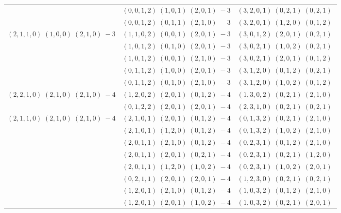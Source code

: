 \documentclass[11pt]{article}
\begin{document}
\begin{longtable}[l]{|c|c|c|}
 \cline{2-3} 
 & $(0 ,0 ,1 ,2) \;(1 ,0 ,1) \;(2 ,0 ,1) \;-3$ & $(3 ,2 ,0 ,1) \;(0 ,2 ,1) \;(0 ,2 ,1) \;$\\ 
 \cline{2-3} 
 & $(0 ,0 ,1 ,2) \;(0 ,1 ,1) \;(2 ,1 ,0) \;-3$ & $(3 ,2 ,0 ,1) \;(1 ,2 ,0) \;(0 ,1 ,2) \;$\\ \hline\multirow[t]{5}{*}{ $(2 ,1 ,1 ,0) \;(1 ,0 ,0) \;(2 ,1 ,0) \;-3$ }  & $(1 ,1 ,0 ,2) \;(0 ,0 ,1) \;(2 ,0 ,1) \;-3$ & $(3 ,0 ,1 ,2) \;(2 ,0 ,1) \;(0 ,2 ,1) \;$\\ 
 \cline{2-3} 
 & $(1 ,0 ,1 ,2) \;(0 ,1 ,0) \;(2 ,0 ,1) \;-3$ & $(3 ,0 ,2 ,1) \;(1 ,0 ,2) \;(0 ,2 ,1) \;$\\ 
 \cline{2-3} 
 & $(1 ,0 ,1 ,2) \;(0 ,0 ,1) \;(2 ,1 ,0) \;-3$ & $(3 ,0 ,2 ,1) \;(2 ,0 ,1) \;(0 ,1 ,2) \;$\\ 
 \cline{2-3} 
 & $(0 ,1 ,1 ,2) \;(1 ,0 ,0) \;(2 ,0 ,1) \;-3$ & $(3 ,1 ,2 ,0) \;(0 ,1 ,2) \;(0 ,2 ,1) \;$\\ 
 \cline{2-3} 
 & $(0 ,1 ,1 ,2) \;(0 ,1 ,0) \;(2 ,1 ,0) \;-3$ & $(3 ,1 ,2 ,0) \;(1 ,0 ,2) \;(0 ,1 ,2) \;$\\ \hline\multirow[t]{2}{*}{ $(2 ,2 ,1 ,0) \;(2 ,1 ,0) \;(2 ,1 ,0) \;-4$ }  & $(1 ,2 ,0 ,2) \;(2 ,0 ,1) \;(0 ,1 ,2) \;-4$ & $(1 ,3 ,0 ,2) \;(0 ,2 ,1) \;(2 ,1 ,0) \;$\\ 
 \cline{2-3} 
 & $(0 ,1 ,2 ,2) \;(2 ,0 ,1) \;(2 ,0 ,1) \;-4$ & $(2 ,3 ,1 ,0) \;(0 ,2 ,1) \;(0 ,2 ,1) \;$\\ \hline\multirow[t]{13}{*}{ $(2 ,1 ,1 ,0) \;(2 ,1 ,0) \;(2 ,1 ,0) \;-4$ }  & $(2 ,1 ,0 ,1) \;(2 ,0 ,1) \;(0 ,1 ,2) \;-4$ & $(0 ,1 ,3 ,2) \;(0 ,2 ,1) \;(2 ,1 ,0) \;$\\ 
 \cline{2-3} 
 & $(2 ,1 ,0 ,1) \;(1 ,2 ,0) \;(0 ,1 ,2) \;-4$ & $(0 ,1 ,3 ,2) \;(1 ,0 ,2) \;(2 ,1 ,0) \;$\\ 
 \cline{2-3} 
 & $(2 ,0 ,1 ,1) \;(2 ,1 ,0) \;(0 ,1 ,2) \;-4$ & $(0 ,2 ,3 ,1) \;(0 ,1 ,2) \;(2 ,1 ,0) \;$\\ 
 \cline{2-3} 
 & $(2 ,0 ,1 ,1) \;(2 ,0 ,1) \;(0 ,2 ,1) \;-4$ & $(0 ,2 ,3 ,1) \;(0 ,2 ,1) \;(1 ,2 ,0) \;$\\ 
 \cline{2-3} 
 & $(2 ,0 ,1 ,1) \;(1 ,2 ,0) \;(1 ,0 ,2) \;-4$ & $(0 ,2 ,3 ,1) \;(1 ,0 ,2) \;(2 ,0 ,1) \;$\\ 
 \cline{2-3} 
 & $(0 ,2 ,1 ,1) \;(2 ,0 ,1) \;(2 ,0 ,1) \;-4$ & $(1 ,2 ,3 ,0) \;(0 ,2 ,1) \;(0 ,2 ,1) \;$\\ 
 \cline{2-3} 
 & $(1 ,2 ,0 ,1) \;(2 ,1 ,0) \;(0 ,1 ,2) \;-4$ & $(1 ,0 ,3 ,2) \;(0 ,1 ,2) \;(2 ,1 ,0) \;$\\ 
 \cline{2-3} 
 & $(1 ,2 ,0 ,1) \;(2 ,0 ,1) \;(1 ,0 ,2) \;-4$ & $(1 ,0 ,3 ,2) \;(0 ,2 ,1) \;(2 ,0 ,1) \;$\\ 

\end{longtable}
\end{document}
